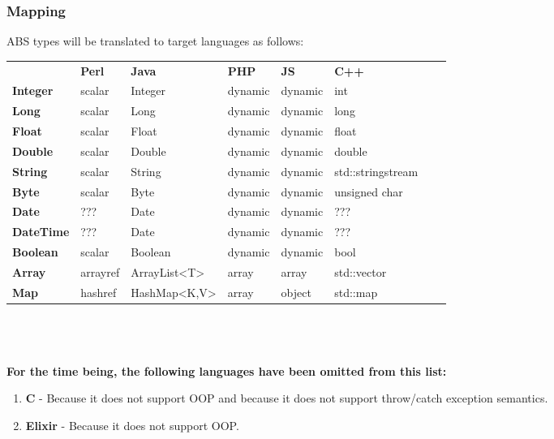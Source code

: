\documentclass[hidelinks]{article}
\begin{document}
\subsubsection{Mapping}
ABS types will be translated to target languages as follows:\\
\begin{tabular}{llllllll}
                  & \textbf{Perl} & \textbf{Java}                       & \textbf{PHP} & \textbf{JS} & \textbf{C++} \\
\textbf{Integer}  & scalar        & Integer                             & dynamic      & dynamic     & int             \\
\textbf{Long}     & scalar        & Long                                & dynamic      & dynamic     & long             \\
\textbf{Float}    & scalar        & Float                               & dynamic      & dynamic     & float             \\
\textbf{Double}   & scalar        & Double                              & dynamic      & dynamic     & double             \\
\textbf{String}   & scalar        & String                              & dynamic      & dynamic     & std::stringstream          \\
\textbf{Byte}     & scalar        & Byte                                & dynamic      & dynamic      & unsigned char             \\
\textbf{Date}     & ???        & Date                                & dynamic      & dynamic     & ???             \\
\textbf{DateTime} & ???        & Date                                & dynamic      & dynamic     & ???             \\
\textbf{Boolean}  & scalar        & Boolean                             & dynamic      & dynamic     & bool             \\
\textbf{Array}    & arrayref      & ArrayList\textless{}T\textgreater{} & array        & array       & std::vector             \\
\textbf{Map}      & hashref       & HashMap\textless{}K,V\textgreater{} & array        & object     & std::map            
\end{tabular}
\\\\\\
\textbf{For the time being, the following languages have been omitted from this list:}
\begin{enumerate}
\item \textbf{C} - Because it does not support OOP and because it does not support throw/catch exception semantics.
\item \textbf{Elixir} - Because it does not support OOP.
\end{enumerate}
\end{document}
